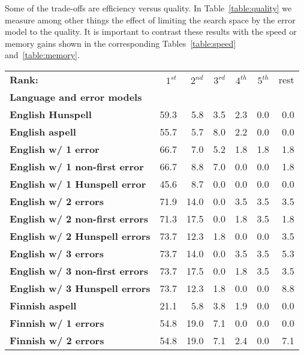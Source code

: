 \documentclass[a4paper,12pt]{article}
\begin{document}
Some of the trade-offs are efficiency versus quality. In
Table~\ref{table:quality} we measure among other things the effect of limiting the
search space by the error model to the quality. It is important to contrast
these results with the speed or memory gains shown in the corresponding
Tables~\ref{table:speed} and~\ref{table:memory}.

\begin{table}
    \centering
    \begin{tabular}{|l|r|r|r|r|r|r|}
        \hline
        \bf Rank: & $1^{st}$ & $2^{nd}$ & $3^{rd}$ & $4^{th}$ & $5^{th}$ & rest \\
        \bf Language and error models & & & & & & \\
        \hline
        \bf English Hunspell & 59.3 & 5.8 & 3.5 & 2.3 & 0.0 & 0.0 \\
          \bf English aspell & 55.7 & 5.7 & 8.0 & 2.2 & 0.0 & 0.0 \\
        \hline
        \bf English w/ 1 error & 66.7 & 7.0 & 5.2 & 1.8 & 1.8 & 1.8 \\
 \bf English w/ 1 non-first error & 66.7 & 8.8 & 7.0 & 0.0 & 0.0 & 1.8 \\
 \bf English w/ 1 Hunspell error & 45.6 & 8.7 & 0.0 & 0.0 & 0.0 & 0.0 \\
     \bf English w/ 2 errors & 71.9 & 14.0 & 0.0 & 3.5 & 3.5 & 3.5 \\
 \bf English w/ 2 non-first errors & 71.3 & 17.5 & 0.0 & 1.8 & 3.5 & 1.8 \\
 \bf English w/ 2 Hunspell errors & 73.7 & 12.3 & 1.8 & 0.0 & 0.0 & 3.5 \\
   \bf English w/ 3 errors & 73.7 & 14.0 & 0.0 & 3.5 & 3.5 & 5.3 \\
 \bf English w/ 3 non-first errors & 73.7 & 17.5 & 0.0 & 1.8 & 3.5 & 3.5 \\
 \bf English w/ 3 Hunspell errors & 73.7 & 12.3 & 1.8 & 0.0 & 0.0 & 8.8 \\
        \hline
       \bf Finnish aspell & 21.1 & 5.8 & 3.8 & 1.9 & 0.0 & 0.0 \\
        \bf Finnish w/ 1 errors & 54.8 & 19.0 & 7.1 & 0.0 & 0.0 & 0.0 \\
        \bf Finnish w/ 2 errors & 54.8 & 19.0 & 7.1 & 2.4 & 0.0 & 7.1 \\

\end{tabular}
\end{table}
\end{document}
